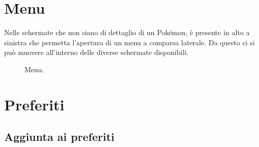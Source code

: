 \documentclass[a4paper,11pt]{article}
\begin{document}
\section{Menu}
Nelle schermate che non siano di dettaglio di un Pokémon, è presente in alto a sinistra che permetta l’apertura di un menu a comparsa laterale. Da questo ci si può muovere all’interno delle diverse schermate disponibili.
  \begin{figure}[h!]
    \centering
  \caption{Menu.}
\end{figure}
\newpage

\section{Preferiti}
    \subsection{Aggiunta ai preferiti}
\end{document}
